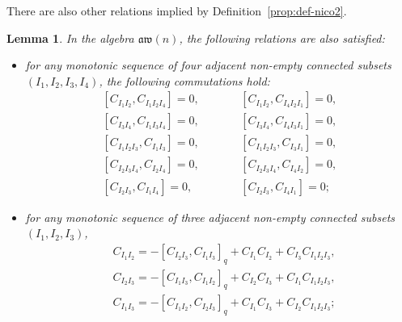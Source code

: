 \documentclass[pdftex]{sigma}
\numberwithin{equation}{section}
\newtheorem{lemm}[theo]{Lemma}
\theoremstyle{definition}
\newcommand{\aw}{\mathfrak{aw}(n)}
\begin{document}
There are also other relations implied by Definition~\ref{prop:def-nico2}.
\begin{lemm}\label{prop:def-nico}
In the algebra $\aw$, the following relations are also satisfied:
\begin{itemize}\itemsep=0pt
\item for any monotonic sequence of four adjacent non-empty connected subsets $(I_1,I_2,I_3,I_4)$, the following commutations hold:
\begin{subequations}\label{rel:com}
\begin{alignat}{3}
 & [C_{I_1I_2}, C_{I_1I_2I_4} ]=0 ,\qquad&& [C_{I_1I_2}, C_{I_4I_2I_1} ]=0 ,&\label{rel:com1}\\
 & [C_{I_3I_4}, C_{I_1I_3I_4} ]=0 ,\qquad&& [C_{I_3I_4}, C_{I_4I_3I_1} ]=0 ,&\nonumber\\ %
 & [C_{I_1I_2I_3}, C_{I_1I_3}]=0 ,\qquad&& [C_{I_1I_2I_3}, C_{I_3I_1}]=0 ,&\nonumber\\ %
 & [C_{I_2I_3I_4}, C_{I_2I_4}]=0 ,\qquad&& [C_{I_2I_3I_4}, C_{I_4I_2}]=0 ,&\nonumber\\ %
 & [C_{I_2I_3}, C_{I_1I_4} ]=0 ,\qquad&& [C_{I_2I_3}, C_{I_4I_1} ]=0 ;&\nonumber %
\end{alignat}
\end{subequations}

\item for any monotonic sequence of three adjacent non-empty connected subsets $(I_1,I_2,I_3)$,
\begin{subequations}\label{relaw3}
\begin{align}
 & C_{I_1I_2}=-[C_{I_2I_3},C_{I_1I_3}]_q+C_{I_1}C_{I_2}+C_{I_3}C_{I_1I_2I_3} , \label{relaw31}\\
 & C_{I_2I_3}=-[C_{I_1I_3},C_{I_1I_2}]_q+C_{I_2}C_{I_3}+C_{I_1}C_{I_1I_2I_3}, \label{relaw32}\\
&C_{I_1I_3}=-[C_{I_1I_2},C_{I_2I_3}]_q+C_{I_1}C_{I_3}+C_{I_2}C_{I_1I_2I_3}\label{relaw33};
\end{align}
\end{subequations}



\end{itemize}
\end{lemm}
\end{document}
